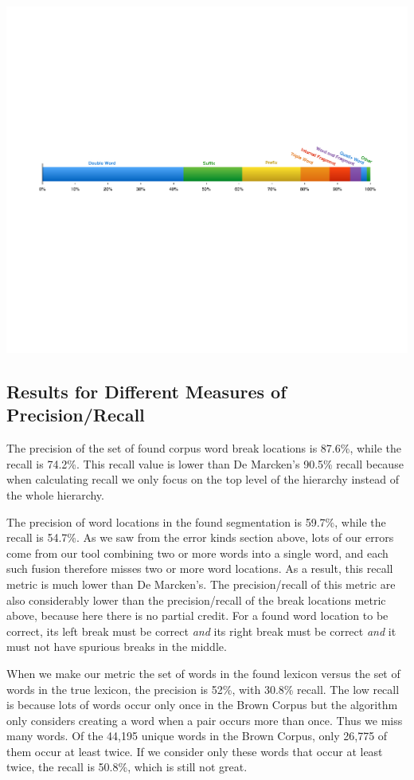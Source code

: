 \documentclass[11pt, oneside, fleqn]{article}
\begin{document}
  \includegraphics[scale=0.55]{./figure/error_nature_classfier.pdf}

  \subsection{Results for Different Measures of Precision/Recall}

  The precision of the set of found corpus word break locations is 87.6\%, while the recall is 74.2\%. This recall value is lower than De Marcken's 90.5\% recall because when calculating recall we only focus on the top level of the hierarchy instead of the whole hierarchy.

  The precision of word locations in the found segmentation is 59.7\%, while the recall is 54.7\%. As we saw from the error kinds section above, lots of our errors come from our tool combining two or more words into a single word, and each such fusion therefore misses two or more word locations. As a result, this recall metric is much lower than De Marcken's. The precision/recall of this metric are also considerably lower than the precision/recall of the break locations metric above, because here there is no partial credit. For a found word location to be correct, its left break must be correct \textit{and} its right break must be correct \textit{and} it must not have spurious breaks in the middle.

  When we make our metric the set of words in the found lexicon versus the set of words in the true lexicon, the precision is 52\%, with 30.8\% recall. The low recall is because lots of words occur only once in the Brown Corpus but the algorithm only considers creating a word when a pair occurs more than once. Thus we miss many words. Of the 44,195 unique words in the Brown Corpus, only 26,775 of them occur at least twice. If we consider only these words that occur at least twice, the recall is 50.8\%, which is still not great.
\end{document}
